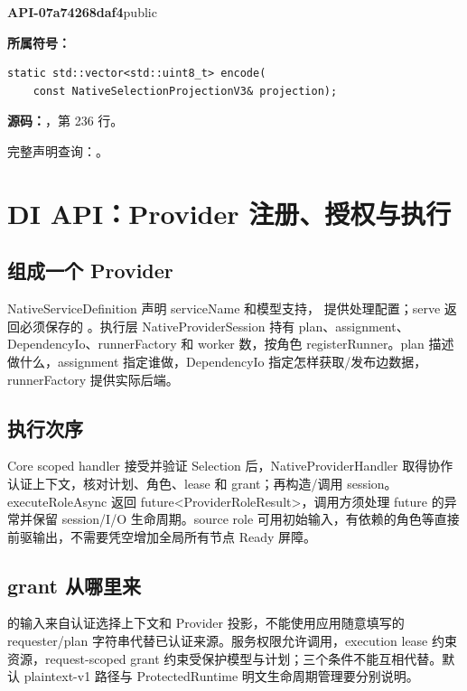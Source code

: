 \textbf{API-07a74268daf4}\quad public\par
\textbf{所属符号：}\par
\begin{Verbatim}[fontsize=\footnotesize,breaklines,breakanywhere]
static std::vector<std::uint8_t> encode(
    const NativeSelectionProjectionV3& projection);
\end{Verbatim}
\textbf{源码：}，第 236 行。\par

完整声明查询：。

\section{DI API：Provider 注册、授权与执行}

\subsection{组成一个 Provider}
NativeServiceDefinition 声明 serviceName 和模型支持， 提供处理配置；serve 返回必须保存的 。执行层 NativeProviderSession 持有 plan、assignment、DependencyIo、runnerFactory 和 worker 数，按角色 registerRunner。plan 描述做什么，assignment 指定谁做，DependencyIo 指定怎样获取/发布边数据，runnerFactory 提供实际后端。

\subsection{执行次序}
Core scoped handler 接受并验证 Selection 后，NativeProviderHandler 取得协作认证上下文，核对计划、角色、lease 和 grant；再构造/调用 session。executeRoleAsync 返回 future<ProviderRoleResult>，调用方须处理 future 的异常并保留 session/I/O 生命周期。source role 可用初始输入，有依赖的角色等直接前驱输出，不需要凭空增加全局所有节点 Ready 屏障。

\subsection{grant 从哪里来}
 的输入来自认证选择上下文和 Provider 投影，不能使用应用随意填写的 requester/plan 字符串代替已认证来源。服务权限允许调用，execution lease 约束资源，request-scoped grant 约束受保护模型与计划；三个条件不能互相代替。默认 plaintext-v1 路径与 ProtectedRuntime 明文生命周期管理要分别说明。

